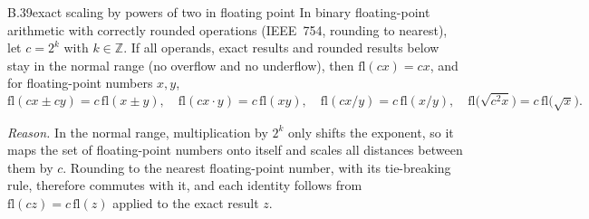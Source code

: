 \begin{auxresult}{B.39}{exact scaling by powers of two in floating point}{\citep[Ch.~2]{xhigham2002accuracy}}
In binary floating-point arithmetic with correctly rounded operations (IEEE~754, rounding to nearest), let $c=2^k$ with
$k\in\mathbb Z$. If all operands, exact results and rounded results below stay in the normal range (no overflow and no
underflow), then $\mathrm{fl}(cx)=cx$, and for floating-point numbers $x,y$,
\[\mathrm{fl}(cx\pm cy)=c\,\mathrm{fl}(x\pm y),\quad\mathrm{fl}(cx\cdot y)=c\,\mathrm{fl}(xy),\quad
\mathrm{fl}(cx/y)=c\,\mathrm{fl}(x/y),\quad\mathrm{fl}\big(\sqrt{c^2x}\big)=c\,\mathrm{fl}\big(\sqrt x\big).\]
\end{auxresult}
\noindent\emph{Reason.} In the normal range, multiplication by $2^k$ only shifts the exponent, so it maps the set of
floating-point numbers onto itself and scales all distances between them by $c$. Rounding to the nearest floating-point
number, with its tie-breaking rule, therefore commutes with it, and each identity follows from
$\mathrm{fl}(cz)=c\,\mathrm{fl}(z)$ applied to the exact result $z$.
